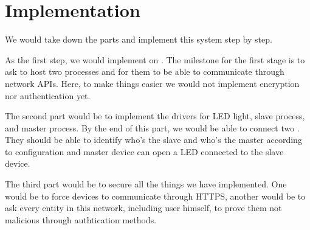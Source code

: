 \section{Implementation}

We would take down the parts and implement this system step by step.

As the first step, we would implement \ritos on \rpi. 
The milestone for the first stage is to ask \ritos to host two processes and for them to be able to communicate through network APIs.
Here, to make things easier we would not implement encryption nor authentication yet.

The second part would be to implement the drivers for LED light, slave process, and master process.
By the end of this part, we would be able to connect two \rpis. 
They should be able to identify who's the slave and who's the master according to configuration and master device can open a LED  connected to the slave device.

The third part would be to secure all the things we have implemented.
One would be to force devices to communicate through HTTPS, another would be to ask every entity in this network, including user himself, to prove them not malicious through authtication methods.
